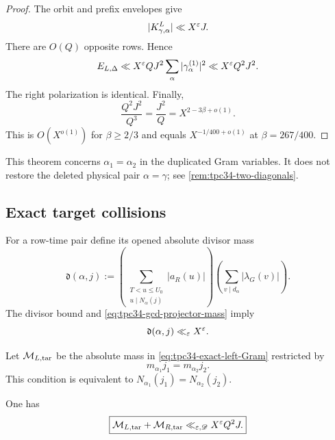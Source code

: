 \begin{proof}
The orbit and prefix envelopes give
\[
 |K^L_{\gamma,\alpha}|\ll X^\varepsilon J.
\]
There are \(O(Q)\) opposite rows.  Hence
\[
 E_{L,\Delta}
 \ll X^\varepsilon QJ^2
 \sum_\alpha|\gamma_\alpha^{(1)}|^2
 \ll X^\varepsilon Q^2J^2.
\]
The right polarization is identical.  Finally,
\[
 \frac{Q^2J^2}{Q^3}=\frac{J^2}{Q}
 =X^{2-3\beta+o(1)}.
\]
This is \(O(X^{o(1)})\) for \(\beta\ge2/3\) and equals
\(X^{-1/400+o(1)}\) at \(\beta=267/400\).
\end{proof}

\begin{remark}
This theorem concerns \(\alpha_1=\alpha_2\) in the duplicated Gram
variables.  It does not restore the deleted physical pair
\(\alpha=\gamma\); see \cref{rem:tpc34-two-diagonals}.
\end{remark}

\subsection{Exact target collisions}

For a row-time pair define its opened absolute divisor mass
\begin{equation}
 \mathfrak d(\alpha,j)
 :=
 \left(
 \sum_{\substack{T<u\le U_0\\u\mid N_\alpha(j)}}|a_R(u)|
 \right)
 \left(\sum_{v\mid d_\alpha}|\lambda_G(v)|\right).
 \label{eq:tpc34-opened-divisor-mass}
\end{equation}
The divisor bound and \eqref{eq:tpc34-gcd-projector-mass} imply
\begin{equation}
 \mathfrak d(\alpha,j)\ll_\varepsilon X^\varepsilon.
 \label{eq:tpc34-opened-divisor-envelope}
\end{equation}

Let \(\mathcal M_{L,\mathrm{tar}}\) be the absolute mass in
\eqref{eq:tpc34-exact-left-Gram} restricted by
\begin{equation}
 m_{\alpha_1}j_1=m_{\alpha_2}j_2.
 \label{eq:tpc34-target-collision-condition}
\end{equation}
This condition is equivalent to
\(N_{\alpha_1}(j_1)=N_{\alpha_2}(j_2)\).

\begin{proposition}
\label{prop:tpc34-target-collision}
One has
\begin{equation}
 \boxed{
 \mathcal M_{L,\mathrm{tar}}+\mathcal M_{R,\mathrm{tar}}
 \ll_{\varepsilon,\mathscr D}X^\varepsilon Q^2J.}
 \label{eq:tpc34-target-collision-bound}
\end{equation}
\end{proposition}

